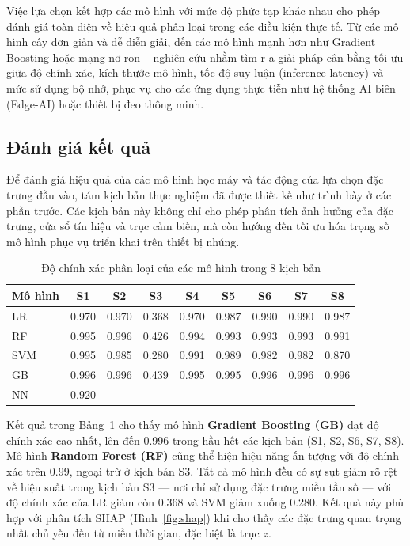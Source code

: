 Việc lựa chọn kết hợp các mô hình với mức độ phức tạp khác nhau cho phép đánh giá toàn diện về 
hiệu quả phân loại trong các điều kiện thực tế. 
Từ các mô hình cây đơn giản và dễ diễn giải, đến các mô hình mạnh 
hơn như Gradient Boosting hoặc mạng nơ-ron – nghiên cứu nhằm tìm r
a giải pháp cân bằng tối ưu giữa độ chính xác, kích thước mô hình, 
tốc độ suy luận (inference latency) và mức sử dụng bộ nhớ, 
phục vụ cho các ứng dụng thực tiễn như hệ thống AI biên (Edge-AI) 
hoặc thiết bị đeo thông minh.
\subsection{Đánh giá kết quả}
Để đánh giá hiệu quả của các mô hình học máy và tác động của lựa 
chọn đặc trưng đầu vào, tám kịch bản thực nghiệm đã được thiết kế 
như trình bày ở các phần trước. Các kịch bản này không chỉ cho phép 
phân tích ảnh hưởng của đặc trưng, cửa sổ tín hiệu và trục cảm biến, 
mà còn hướng đến tối ưu hóa trọng số mô hình phục vụ triển khai trên 
thiết bị nhúng.


\begin{table}[htbp]
\caption{Độ chính xác phân loại của các mô hình trong 8 kịch bản}
\label{tab:accuracy}
\centering
\renewcommand{\arraystretch}{1.1}
\scriptsize
\begin{tabular}{|l|c|c|c|c|c|c|c|c|}
\hline
\textbf{Mô hình} & S1 & S2 & S3 & S4 & S5 & S6 & S7 & S8 \\
\hline
LR  & 0.970 & 0.970 & 0.368 & 0.970 & 0.987 & 0.990 & 0.990 & 0.987 \\
RF  & 0.995 & 0.996 & 0.426 & 0.994 & 0.993 & 0.993 & 0.993 & 0.991 \\
SVM & 0.995 & 0.985 & 0.280 & 0.991 & 0.989 & 0.982 & 0.982 & 0.870 \\
GB  & 0.996 & 0.996 & 0.439 & 0.995 & 0.995 & 0.996 & 0.996 & 0.996 \\
NN  &  0.920 &  --   &  --   &  --   &  --   &  --   &  --   & -- \\
\hline
\end{tabular}
\end{table}

Kết quả trong Bảng~\ref{tab:accuracy} cho thấy mô hình 
\textbf{Gradient Boosting (GB)} đạt độ chính xác cao nhất, 
lên đến 0.996 trong hầu hết các kịch bản (S1, S2, S6, S7, S8). 
Mô hình \textbf{Random Forest (RF)} cũng thể hiện hiệu năng ấn tượng 
với độ chính xác trên 0.99, ngoại trừ ở kịch bản S3. 
Tất cả mô hình đều có sự sụt giảm rõ rệt về hiệu suất trong kịch 
bản S3 — nơi chỉ sử dụng đặc trưng miền tần số — 
với độ chính xác của LR giảm còn 0.368 và SVM giảm xuống 0.280. 
Kết quả này phù hợp với phân tích SHAP (Hình~\ref{fig:shap}) 
khi cho thấy các đặc trưng quan trọng nhất chủ yếu đến từ miền 
thời gian, đặc biệt là trục $z$.





